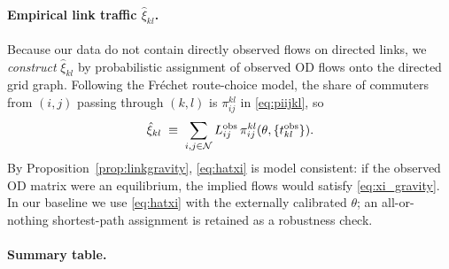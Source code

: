 \paragraph{Empirical link traffic $\hat\xi_{kl}$.}
Because our data do not contain directly observed flows on directed
links, we \emph{construct} $\hat\xi_{kl}$ by probabilistic assignment
of observed OD flows onto the directed grid graph.  Following the
Fr\'echet route-choice model, the share of commuters from $(i,j)$
passing through $(k,l)$ is $\pi^{kl}_{ij}$ in \eqref{eq:piijkl}, so
\begin{equation}\label{eq:hatxi}
  \hat\xi_{kl}
  \;\equiv\;
  \sum_{i,j\in\mathcal N}L_{ij}^{\mathrm{obs}}\,\pi^{kl}_{ij}(\theta,\{t_{kl}^{\mathrm{obs}}\}).
\end{equation}
By Proposition~\ref{prop:linkgravity}, \eqref{eq:hatxi} is model
consistent: if the observed OD matrix were an equilibrium, the
implied flows would satisfy \eqref{eq:xi_gravity}.  In our baseline
we use \eqref{eq:hatxi} with the externally calibrated $\theta$; an
all-or-nothing shortest-path assignment is retained as a
robustness check.

\paragraph{Summary table.}

